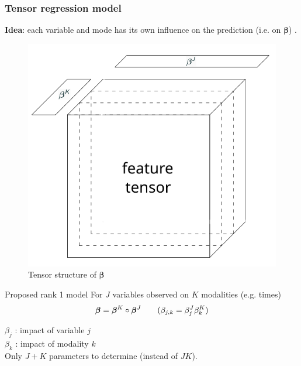 \documentclass{beamer}
\begin{document}




\begin{frame}
    \frametitle{Tensor regression model}
    \textbf{Idea}: each variable and mode has its own influence on the prediction (i.e. on $\bm{\beta}$) \cite{multi_rank_1}.\\[10 pt]
    \begin{overprint}
    \begin{figure}
        \centering
        \includegraphics[scale = 0.3]{images/beta_tens.png}
        \caption{Tensor structure of $\bm{\beta}$}
    \end{figure}
    \begin{block}{Proposed rank 1 model}
    For $J$ variables observed on $K$ modalities (e.g. times)
    $$ \bm{\beta} = \bm{\beta}^K \circ \bm{\beta}^J \hspace{0.7 cm}  (\beta_{j,k} = \beta_j^J\beta_{k}^{K})$$
    \end{block}
    $\beta_j$ : impact of variable $j$\\[5 pt]
    $\beta_k$ : impact of modality $k$\\[10 pt]
    Only $J+K$ parameters to determine (instead of $JK$).
    
\end{overprint}
\end{frame}
\end{document}
